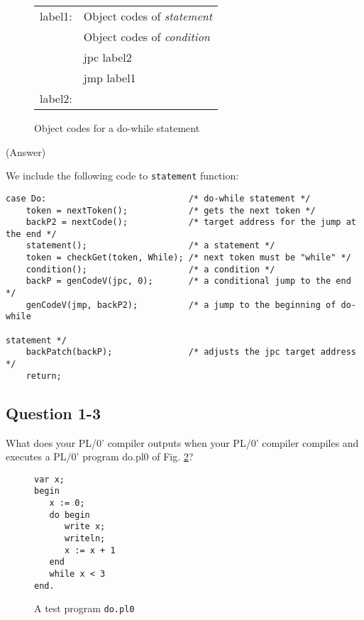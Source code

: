 \documentclass{article}
\begin{document}
\clearpage

\begin{figure}[h]
\begin{tabular}{ll}
label1: & Object codes of {\it statement} \\
        & Object codes of {\it condition} \\
        & jpc label2 \\
        & jmp label1 \\
label2: & \\
\end{tabular}
\caption{Object codes for a do-while statement}
\label{fig:dowhile-code}
\end{figure}

\ifreport
(Answer)\\
\fi

We include the following code to {\tt statement} function:

\begin{verbatim}
case Do:                            /* do-while statement */
    token = nextToken();            /* gets the next token */
    backP2 = nextCode();            /* target address for the jump at the end */
    statement();                    /* a statement */
    token = checkGet(token, While); /* next token must be "while" */
    condition();                    /* a condition */
    backP = genCodeV(jpc, 0);       /* a conditional jump to the end */
    genCodeV(jmp, backP2);          /* a jump to the beginning of do-while
                                                                    statement */
    backPatch(backP);               /* adjusts the jpc target address */
    return;
\end{verbatim}


\subsection*{Question 1-3}
What does your PL/0' compiler outputs when your PL/0' compiler compiles
and executes a PL/0' program do.pl0 of Fig. \ref{fig:do-while}?

\begin{figure}[h]
\begin{verbatim}
var x;
begin
   x := 0;
   do begin
      write x;
      writeln;
      x := x + 1
   end
   while x < 3
end.
\end{verbatim}
\caption{A test program {\tt do.pl0}}\label{fig:do-while}
\end{figure}
\end{document}
